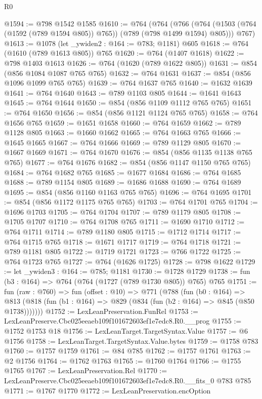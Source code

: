 \begin{lexlean}{R0}
\begin{coremodule}
@1594 := @798 @1542 @1585
@1610 := @764
    (@764
      (@766 (@764 (@1503 (@764 (@1592 (@789 @1594 @805)) @765)) (@789 (@798 @1499 @1594) @805)))
      @767)
@1613 := @1078 (let _ywiden2 : @164 := @783; @1181) @605
@1618 := @764 (@1610 (@789 @1613 @805)) @765
@1620 := @764 (@1407 @1618)
@1622 := @798 @1403 @1613
@1626 := @764 (@1620 (@789 @1622 @805))
@1631 := @854 (@856 @1084 @1087 @765 @765)
@1632 := @764 @1631
@1637 := @854 (@856 @1096 @1099 @765 @765)
@1639 := @764 @1637 @765
@1640 := @1632 @1639
@1641 := @764 @1640
@1643 := @789 @1103 @805
@1644 := @1641 @1643
@1645 := @764 @1644
@1650 := @854 (@856 @1109 @1112 @765 @765)
@1651 := @764 @1650
@1656 := @854 (@856 @1121 @1124 @765 @765)
@1658 := @764 @1656 @765
@1659 := @1651 @1658
@1660 := @764 @1659
@1662 := @789 @1128 @805
@1663 := @1660 @1662
@1665 := @764 @1663 @765
@1666 := @1645 @1665
@1667 := @764 @1666
@1669 := @789 @1129 @805
@1670 := @1667 @1669
@1671 := @764 @1670
@1676 := @854 (@856 @1135 @1138 @765 @765)
@1677 := @764 @1676
@1682 := @854 (@856 @1147 @1150 @765 @765)
@1684 := @764 @1682 @765
@1685 := @1677 @1684
@1686 := @764 @1685
@1688 := @789 @1154 @805
@1689 := @1686 @1688
@1690 := @764 @1689
@1695 := @854 (@856 @1160 @1163 @765 @765)
@1696 := @764 @1695
@1701 := @854 (@856 @1172 @1175 @765 @765)
@1703 := @764 @1701 @765
@1704 := @1696 @1703
@1705 := @764 @1704
@1707 := @789 @1179 @805
@1708 := @1705 @1707
@1710 := @764 @1708 @765
@1711 := @1690 @1710
@1712 := @764 @1711
@1714 := @789 @1180 @805
@1715 := @1712 @1714
@1717 := @764 @1715 @765
@1718 := @1671 @1717
@1719 := @764 @1718
@1721 := @789 @1181 @805
@1722 := @1719 @1721
@1723 := @766 @1722
@1725 := @764 @1723 @765
@1727 := @764 (@1626 @1725)
@1728 := @798 @1622
@1729 := let _ywiden3 : @164 := @785; @1181
@1730 := @1728 @1729
@1738 := fun (b3 : @164) => @764 (@764 (@1727 (@789 @1730 @805)) @765) @765
@1751 := fun (raw : @760) =>
  fun (offset : @10) =>
  @771
    (@788
      (fun (b0 : @164) =>
      @813 (@818 (fun (b1 : @164) => @829 (@834 (fun (b2 : @164) => @845 (@850 @1738)))))))
@1752 := LexLeanPreservation.FunRel
@1753 := LexLeanPreserve.Cbc025eeaeb109f101672603ef1e7edc8.R0.__prog
@1755 := @1752 @1753 @18
@1756 := LexLeanTarget.TargetSyntax.Value
@1757 := @6 @1756
@1758 := LexLeanTarget.TargetSyntax.Value.bytes
@1759 := @1758 @783
@1760 := @1757 @1759
@1761 := @84 @785
@1762 := @1757 @1761
@1763 := @2 @1756
@1764 := @1762 @1763
@1765 := @1760 @1764
@1766 := @1755 @1765
@1767 := LexLeanPreservation.Rel
@1770 := LexLeanPreserve.Cbc025eeaeb109f101672603ef1e7edc8.R0.__fits_0 @783 @785
@1771 := @1767 @1770
@1772 := LexLeanPreservation.encOption

\end{coremodule}
\end{lexlean}
